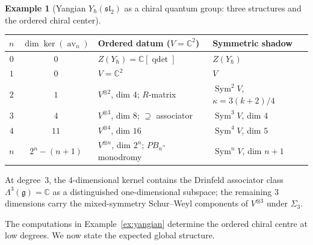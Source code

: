 \documentclass[11pt,reqno]{amsart}
\theoremstyle{definition}
\newtheorem{example}[theorem]{Example}
\theoremstyle{remark}
\DeclareMathOperator{\av}{av}
\newcommand{\fg}{\mathfrak{g}}
\newcommand{\CC}{\mathbb{C}}
\numberwithin{equation}{section}
\begin{document}
\begin{example}[Yangian $Y_\hbar(\mathfrak{sl}_2)$
as a chiral quantum group: three structures and the
ordered chiral center]
\begin{center}
\renewcommand{\arraystretch}{1.3}
\begin{tabular}{@{} c c l l @{}}
\toprule
$n$ & $\dim\ker(\av_n)$ & Ordered datum ($V = \CC^2$)
  & Symmetric shadow \\
\midrule
$0$ & $0$ & $Z(Y_\hbar) = \CC[\operatorname{qdet}]$
  & $Z(Y_\hbar)$ \\
$1$ & $0$ & $V = \CC^2$
  & $V$ \\
$2$ & $1$ & $V^{\otimes 2}$, dim $4$;
  $R$-matrix
  & $\operatorname{Sym}^2 V$,
  $\kappa = 3(k{+}2)/4$ \\
$3$ & $4$ & $V^{\otimes 3}$, dim $8$;
  $\supseteq$ associator
  & $\operatorname{Sym}^3 V$, dim $4$ \\
$4$ & $11$ & $V^{\otimes 4}$, dim $16$
  & $\operatorname{Sym}^4 V$, dim $5$ \\
$n$ & $2^n {-} (n{+}1)$ & $V^{\otimes n}$, dim $2^n$;
  $PB_n$-monodromy
  & $\operatorname{Sym}^n V$, dim $n{+}1$ \\
\bottomrule
\end{tabular}
\end{center}
\noindent
At degree~$3$, the $4$-dimensional kernel contains
the Drinfeld associator class
$\Lambda^3(\fg) = \CC$ as a distinguished
one-dimensional subspace; the remaining $3$ dimensions
carry the mixed-symmetry Schur--Weyl components
of $V^{\otimes 3}$ under $\Sigma_3$.

\end{example}

The computations in Example~\ref{ex:yangian} determine
the ordered chiral centre at low degrees. We now state
the expected global structure.
\end{document}
